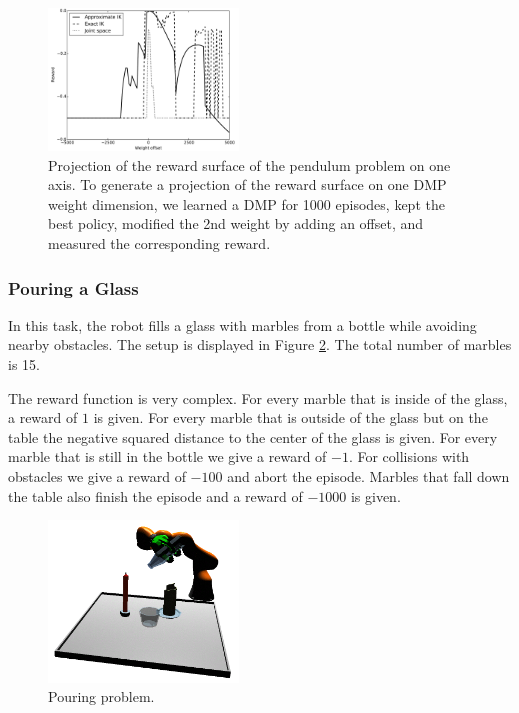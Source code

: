 \documentclass{article}
\begin{document}
\begin{figure}[tb]
\includegraphics[width=0.45\textwidth]{vary_weight_pendulum}
\centering
\caption{
Projection of the reward surface of the pendulum problem on one axis.
To generate a projection of the reward surface on one DMP weight
dimension, we learned a DMP for 1000 episodes, kept the best policy,
modified the 2nd weight by adding an offset, and measured the
corresponding reward.
}
\label{fig:pendulum_vary}
\end{figure}

\subsubsection{Pouring a Glass}

In this task, the robot fills a glass with marbles from a bottle while avoiding
nearby obstacles. The setup is displayed in Figure \ref{fig:pouring}. The
total number of marbles is 15.

The reward function is very complex.
For every marble that is inside of the glass, a reward of $1$ is given. For
every marble that is outside of the glass but on the table the negative
squared distance to the center of the glass is given. For every marble that
is still in the bottle we give a reward of $-1$. For collisions with
obstacles we give a reward of $-100$ and abort the episode. Marbles that
fall down the table also finish the episode and a reward of $-1000$ is
given.

\begin{figure}
\includegraphics[width=0.45\textwidth]{pouring}
\centering
\caption{
Pouring problem.
}
\label{fig:pouring}
\end{figure}
\end{document}
